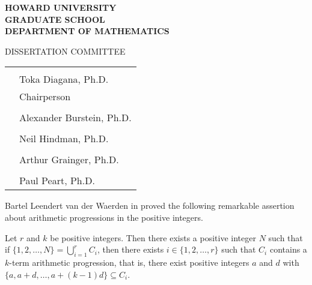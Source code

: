 \documentclass[letterpaper, 12pt, oneside, showtrims, draft]{memoir}
\theoremstyle{plain}
\begin{document}
\newcommand{\approval}{
  \clearpage
  \begin{center}
    \textbf{HOWARD UNIVERSITY} \\
    \textbf{GRADUATE SCHOOL} \\
    \textbf{DEPARTMENT OF MATHEMATICS} \\ \vspace{1em}
    
    DISSERTATION COMMITTEE
  \end{center}

  \newcommand{\sigline}{\makebox[3in]{\hrulefill}}

  \vspace{4em}
  
  \begin{tabular}{@{}l @{}l}
    \hspace{15em} & \sigline \\
    \hspace{15em} & Toka Diagana, Ph.D. \\
    \hspace{15em} & Chairperson \vspace{4em} \\
    \hspace{15em} & \sigline \\
    \hspace{15em} & Alexander Burstein, Ph.D.  \vspace{4em} \\
    \hspace{15em} & \sigline \\
    \hspace{15em} & Neil Hindman, Ph.D.  \vspace{4em} \\
    \hspace{15em} & \sigline \\
    \hspace{15em} & Arthur Grainger, Ph.D. \vspace{4em} \\
    \hspace{15em} & \sigline \\
    \hspace{15em} & Paul Peart, Ph.D. \\
  \end{tabular}
  
  
  \vfill
}

\thetitlepage
\approval


Bartel Leendert van der Waerden in \cite{Van-der-Waerden:1927fk} proved the following remarkable assertion about arithmetic progressions in the positive integers.


  Let $r$ and $k$ be positive integers.
  Then there exists a positive integer $N$ such that if $\{1, 2, \ldots, N\} = \bigcup_{i=1}^r C_i$, then there exists $i \in \{1, 2, \ldots, r\}$ such that $C_i$ contains a $k$-term arithmetic progression, that is, there exist positive integers $a$ and $d$ with $\{a, a+d, \ldots, a + (k-1)d\} \subseteq C_i$.
\end{document}
